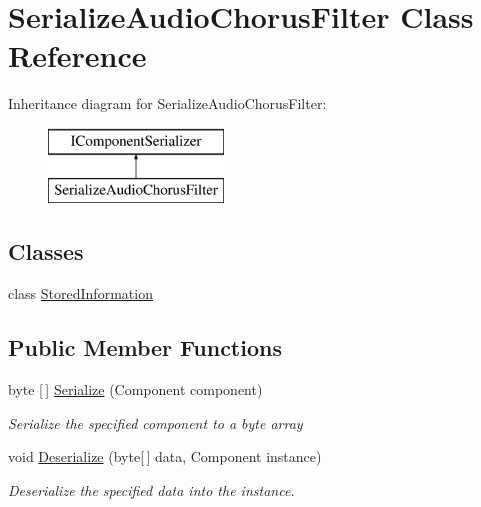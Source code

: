 \hypertarget{class_serialize_audio_chorus_filter}{}\section{Serialize\+Audio\+Chorus\+Filter Class Reference}
\label{class_serialize_audio_chorus_filter}
Inheritance diagram for Serialize\+Audio\+Chorus\+Filter\+:\begin{figure}[H]
\begin{center}
\leavevmode
\includegraphics[height=2.000000cm]{class_serialize_audio_chorus_filter}
\end{center}
\end{figure}
\subsection*{Classes}
\begin{DoxyCompactItemize}
\item 
class \hyperlink{class_serialize_audio_chorus_filter_1_1_stored_information}{Stored\+Information}
\end{DoxyCompactItemize}
\subsection*{Public Member Functions}
\begin{DoxyCompactItemize}
\item 
byte \mbox{[}$\,$\mbox{]} \hyperlink{class_serialize_audio_chorus_filter_a1cedba3237b73240c2fb96f8831dc834}{Serialize} (Component component)
\begin{DoxyCompactList}\small\item\em Serialize the specified component to a byte array \end{DoxyCompactList}\item 
void \hyperlink{class_serialize_audio_chorus_filter_a2e5e9eeee7a3053843911ddd0ca0ae00}{Deserialize} (byte\mbox{[}$\,$\mbox{]} data, Component instance)
\begin{DoxyCompactList}\small\item\em Deserialize the specified data into the instance. \end{DoxyCompactList}\end{DoxyCompactItemize}


